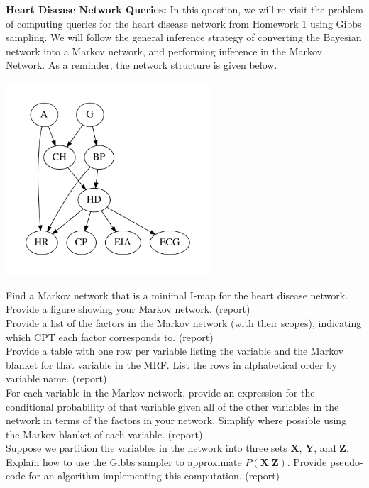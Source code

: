 \documentclass[11pt]{article}
\newcommand{\mbf}[1]{{\mathbf{#1}}}
\begin{document}
\begin{problem}{50} \textbf{Heart Disease Network Queries:} In this question, we will re-visit 
the problem of computing queries for the heart disease network from Homework 1 using Gibbs sampling.
We will follow the general inference strategy of converting the Bayesian network into a Markov network,
and performing inference in the Markov Network. As a reminder, the network structure is given
below.
\begin{center}
\includegraphics[width=3in]{figures/bn.pdf}
\end{center}

 Find a Markov network that is a minimal I-map for the heart disease network.
Provide a figure showing your Markov network. (report)\\

 Provide a list of the factors in the Markov network (with their scopes), indicating 
which CPT each factor corresponds to. (report)\\

 Provide a table with one row per variable listing the variable and the Markov blanket for 
that variable in the MRF. List the rows in alphabetical order by variable name. (report)\\

 For each variable in the Markov network, provide an expression for the conditional probability of that
variable given all of the other variables in the network in terms of the factors in your network. 
Simplify where possible using the Markov blanket of each variable.  (report)\\

 Suppose we partition the variables in the network into three sets $\mbf{X}$, $\mbf{Y}$, and $\mbf{Z}$.
Explain how to use the Gibbs sampler to approximate $P(\mbf{X}|\mbf{Z})$. Provide pseudo-code for an
algorithm implementing this computation. (report)\\


\end{problem}
\end{document}
